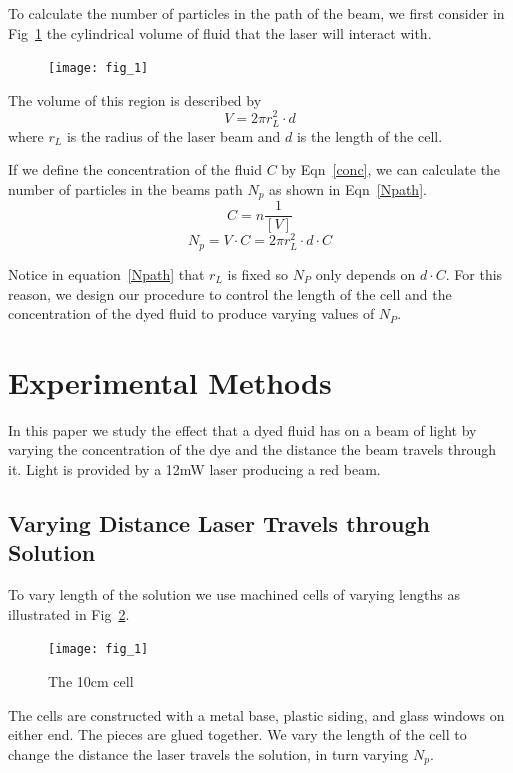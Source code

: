 \documentclass[aps,prl,reprint,groupedaddress,amsmath,amssymb,aps]{revtex4-1}
\begin{document}
	To calculate the number of particles in the path of the beam, we first consider in Fig~\ref{laservolume} the cylindrical volume of fluid that the laser will interact with. 
	\begin{figure}
		\texttt{[image: fig\_1]}
		\caption{\label{laservolume}}
	\end{figure}
	The volume of this region is described by
	\begin{equation}
		V=2\pi r_L^2 \cdot d
	\end{equation}
	where $r_L$ is the radius of the laser beam and $d$ is the length of the cell.
	
	If we define the concentration of the fluid $C$ by Eqn~\ref{conc}, we can calculate the number of particles in the beams path $N_p$ as shown in Eqn~\ref{Npath}.
	\begin{equation}
	\label{conc}
	C = n \frac{1}{[V]}
	\end{equation}
	\begin{equation}
		\label{Npath}
		N_p = V\cdot C = 2\pi r_L^2 \cdot d \cdot C
	\end{equation}
	
	Notice in equation~\ref{Npath} that $r_L$ is fixed so $N_P$ only depends on $d\cdot C$. For this reason, we design our procedure to control the length of the cell and the concentration of the dyed fluid to produce varying values of $N_P$.
	
	\section{\label{sec:level1}Experimental Methods}
	In this paper we study the effect that a dyed fluid has on a beam of light by varying the concentration of the dye and the distance the beam travels through it. Light is provided by a 12mW laser producing a red beam.
	
	\subsection{Varying Distance Laser Travels through Solution}
	To vary length of the solution we use machined cells of varying lengths as illustrated in Fig~\ref{cellDiagram}.
	\begin{figure}[b]
		\texttt{[image: fig\_1]}
		\caption{\label{cellDiagram}The 10cm cell}
	\end{figure}
	The cells are constructed with a metal base, plastic siding, and glass windows on either end. The pieces are glued together. We vary the length of the cell to change the distance the laser travels the solution, in turn varying $N_p$.
	
\end{document}
